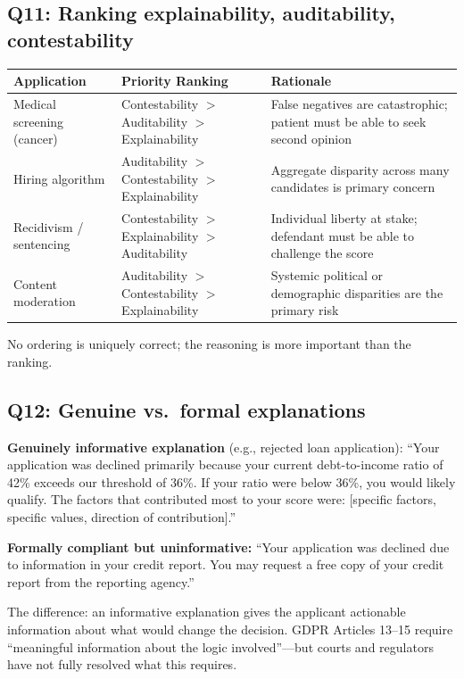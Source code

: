 \subsection*{Q11: Ranking explainability, auditability, contestability}

\begin{center}
\begin{tabular}{p{3.5cm}p{3cm}p{5cm}}
\toprule
\textbf{Application} & \textbf{Priority Ranking} & \textbf{Rationale} \\
\midrule
Medical screening (cancer) & Contestability $>$ Auditability $>$ Explainability & False negatives are catastrophic; patient must be able to seek second opinion \\
\addlinespace
Hiring algorithm & Auditability $>$ Contestability $>$ Explainability & Aggregate disparity across many candidates is primary concern \\
\addlinespace
Recidivism / sentencing & Contestability $>$ Explainability $>$ Auditability & Individual liberty at stake; defendant must be able to challenge the score \\
\addlinespace
Content moderation & Auditability $>$ Contestability $>$ Explainability & Systemic political or demographic disparities are the primary risk \\
\bottomrule
\end{tabular}
\end{center}

No ordering is uniquely correct; the reasoning is more important than the ranking.

\subsection*{Q12: Genuine vs.\ formal explanations}

\textbf{Genuinely informative explanation} (e.g., rejected loan application): ``Your application was declined primarily because your current debt-to-income ratio of 42\% exceeds our threshold of 36\%. If your ratio were below 36\%, you would likely qualify. The factors that contributed most to your score were: [specific factors, specific values, direction of contribution].''

\textbf{Formally compliant but uninformative:} ``Your application was declined due to information in your credit report. You may request a free copy of your credit report from the reporting agency.''

The difference: an informative explanation gives the applicant actionable information about what would change the decision. GDPR Articles 13--15 require ``meaningful information about the logic involved''---but courts and regulators have not fully resolved what this requires.

